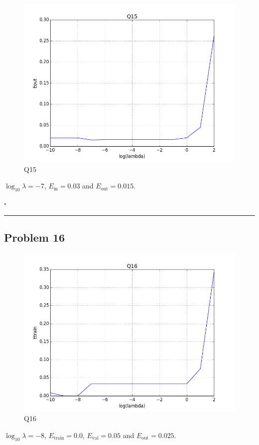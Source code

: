 \documentclass[12pt]{article}
\newcommand*{\QEDB}{\hfill\ensuremath{\square}}
\newcommand{\horrule}[1]{\rule{\linewidth}{#1}}
\begin{document}
\begin{figure}[h]
	\centering
	\includegraphics[scale=0.3]{Q15.png}
	\caption{Q15}
	\label{Q15}
\end{figure}
$\log_{10}\lambda=-7$, $E_{\text{in}}=0.03$ and $E_{\text{out}}=0.015$.

\QEDB

\horrule{0.5pt}

\subsection*{Problem 16}

\begin{figure}[h]
	\centering
	\includegraphics[scale=0.3]{Q16.png}
	\caption{Q16}
	\label{Q16}
\end{figure}
$\log_{10}\lambda=-8$, $E_{\text{train}}=0.0$, $E_{\text{val}}=0.05$ and $E_{\text{out}}=0.025$.

\end{document}
